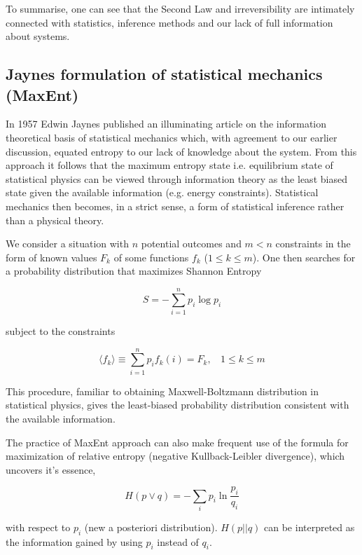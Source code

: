 \documentclass[a4paper,12pt]{article}
\begin{document}
To summarise, one can see that the Second Law and irreversibility are intimately connected with statistics, inference methods and our lack of full information about systems.

\subsection{Jaynes formulation of statistical mechanics (MaxEnt)}

In 1957 Edwin Jaynes published an illuminating article on the information theoretical basis of statistical mechanics which, with agreement to our earlier discussion, equated entropy to our lack of knowledge about the system. From this approach it follows that the maximum entropy state i.e. equilibrium state of statistical physics can be viewed through information theory as the least biased state given the available information (e.g. energy constraints).
Statistical mechanics then becomes, in a strict sense, a form of statistical inference rather than a physical theory.

We consider a situation with $n$ potential outcomes and $m<n$ constraints in the form of known values $F_k$ of some functions $f_k$ ($1 \leq k \leq m$).
One then searches for a probability distribution that maximizes Shannon Entropy

\begin{equation}
  S=-\sum_{i=1}^n p_i \log p_i
\end{equation}

subject to the constraints

\begin{equation}
  \langle f_k \rangle \equiv \sum_{i=1}^n p_i f_k(i)=F_k,\ \ \ \  1\leq k \leq m
\end{equation}

This procedure, familiar to obtaining Maxwell-Boltzmann distribution in statistical physics, gives the least-biased probability distribution consistent with the available information.

The practice of MaxEnt approach can also make frequent use of the formula for maximization of relative entropy (negative Kullback-Leibler divergence), which uncovers it's essence,

\begin{equation}
\label{Kullback-Leibler}
    H(p\lor q) = -\sum_i p_i \ln \frac{p_i}{q_i}
\end{equation}


with respect to $p_i$ (new a posteriori distribution). $H(p||q)$ can be interpreted as the information gained by using $p_i$ instead of $q_i$.
\end{document}
